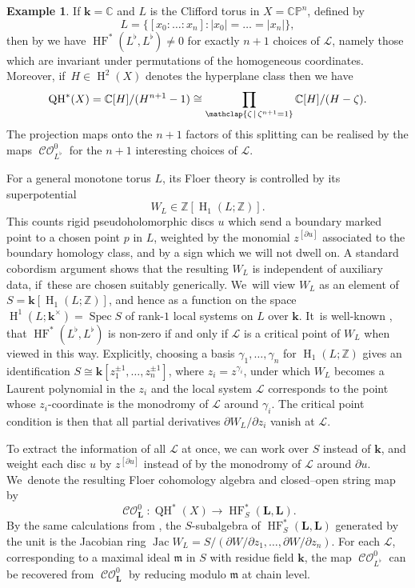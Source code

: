 \documentclass[JEP,XML,SOM,Unicode,NoEqCountersInSection,NoFloatCountersInSection,published]{cedram}
\theoremstyle{definition}
\newtheorem{example}[theorem]{Example}
\newcommand{\CC}{\mathbb{C}}
\newcommand{\ZZ}{\mathbb{Z}}
\newcommand{\PP}{\mathbb{P}}
\newcommand{\LL}{L^\flat}
\newcommand{\calL}{\mathcal{L}}
\newcommand{\kk}{{\boldsymbol{k}}}
\newcommand{\bL}{{\boldsymbol{L}}}
\newcommand{\m}{\mathfrak{m}}
\newcommand{\rH}{\operatorname{H}}
\newcommand{\HF}{\operatorname{HF}}
\newcommand{\Spec}{\operatorname{Spec}}
\newcommand{\CO}{\operatorname{\mathcal{CO}}}
\newcommand{\QH}{\operatorname{QH}}
\newcommand{\Jac}{\operatorname{Jac}}
\begin{document}
\begin{example}
If $\kk = \CC$ and $L$ is the Clifford torus in $X = \CC\PP^n$, defined by
\[
L = \{[x_0 : \dots : x_n] : \lvert x_0 \rvert = \dots = \lvert x_n \rvert\},
\]
then by \cite{Cho} we have $\HF^*(\LL, \LL) \neq 0$ for exactly $n+1$ choices of $\calL$, namely those which are invariant under permutations of the homogeneous coordinates. Moreover, if~$H \in \rH^2(X)$ denotes the hyperplane class then we have
\[
\QH^*(X) = \CC[H] / (H^{n+1} - 1) \cong \prod_{\mathclap{\zeta\,\mid\, \zeta^{n+1} = 1}} \CC[H] / (H - \zeta).
\]
The projection maps onto the $n+1$ factors of this splitting can be realised by the maps $\CO^0_{\LL}$ for the $n+1$ interesting choices of $\calL$.
\end{example}

For a general monotone torus $L$, its Floer theory is controlled by its superpotential
\[
W_L \in \ZZ[\rH_1(L; \ZZ)].
\]
This counts rigid pseudoholomorphic discs $u$ which send a boundary marked point to a chosen point $p$ in $L$, weighted by the monomial $z^{[\partial u]}$ associated to the boundary homology class, and by a sign which we will not dwell on. A standard cobordism argument shows that the resulting $W_L$ is independent of auxiliary data, if~these are chosen suitably generically. We~will view $W_L$ as an element of $S = \kk[\rH_1(L; \ZZ)]$, and hence as a function on the space $\rH^1(L; \kk^\times) = \Spec S$ of rank-$1$ local systems on $L$ over $\kk$. It~is well-known \cite[\S 13]{ChoOh}, \cite[Prop.\,3.3.1]{BiranCorneaLTEG} that $\HF^*(\LL, \LL)$ is non-zero if and only if $\calL$ is a critical point of $W_L$ when viewed in this way. Explicitly, choosing a basis $\gamma_1, \dots, \gamma_n$ for $\rH_1(L; \ZZ)$ gives an identification $S \cong \kk[z_1^{\pm 1}, \dots, z_n^{\pm 1}]$, where $z_i = z^{\gamma_i}$, under which $W_L$ becomes a Laurent polynomial in the $z_i$ and the local system $\calL$ corresponds to the point whose $z_i$-coordinate is the monodromy of $\calL$ around $\gamma_i$. The critical point condition is then that all partial derivatives $\partial W_L / \partial z_i$ vanish at $\calL$.

To extract the information of all $\calL$ at once, we can work over $S$ instead of $\kk$, and weight each disc $u$ by $z^{[\partial u]}$ instead of by the monodromy of $\calL$ around $\partial u$. We~denote the resulting Floer cohomology algebra and closed--open string map by
\begin{equation}
\label{eqCObL}
\CO^0_\bL : \QH^*(X) \to \HF^*_S(\bL, \bL).
\end{equation}
By the same calculations from \cite{BiranCorneaLTEG}, the $S$-subalgebra of $\HF^*_S(\bL, \bL)$ generated by the unit is the Jacobian ring $\Jac W_L = S / (\partial W / \partial z_1, \dots, \partial W / \partial z_n)$. For each $\calL$, corresponding to a maximal ideal $\m$ in $S$ with residue field $\kk$, the map $\CO^0_{\LL}$ can be recovered from $\CO^0_\bL$ by reducing modulo $\m$ at chain level.
\end{document}
